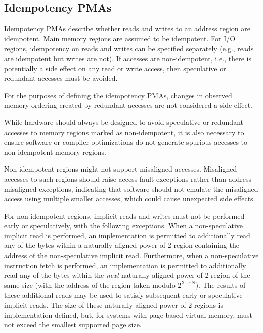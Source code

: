 \subsection{Idempotency PMAs}

Idempotency PMAs describe whether reads and writes to an address
region are idempotent.  Main memory regions are assumed to be
idempotent.  For I/O regions, idempotency on reads and writes can be
specified separately (e.g., reads are idempotent but writes are not).
If accesses are non-idempotent, i.e., there is potentially a side
effect on any read or write access, then speculative or redundant
accesses must be avoided.

For the purposes of defining the idempotency PMAs, changes in observed
memory ordering created by redundant accesses are not considered a
side effect.

\begin{commentary}
While hardware should always be designed to avoid speculative or
redundant accesses to memory regions marked as non-idempotent, it is
also necessary to ensure software or compiler optimizations do not
generate spurious accesses to non-idempotent memory regions.
\end{commentary}

\begin{commentary}
Non-idempotent regions might not support misaligned accesses.  Misaligned
accesses to such regions should raise access-fault exceptions rather than
address-misaligned exceptions, indicating that software should not emulate the
misaligned access using multiple smaller accesses, which could cause
unexpected side effects.
\end{commentary}

For non-idempotent regions, implicit reads and writes must not be performed
early or speculatively, with the following exceptions.
When a non-speculative implicit read is performed, an implementation is
permitted to additionally read any of the bytes within a naturally aligned
power-of-2 region containing the address of the non-speculative implicit read.
Furthermore, when a non-speculative instruction fetch is performed, an
implementation is permitted to additionally read any of the bytes within the
{\em next} naturally aligned power-of-2 region of the same size (with the
address of the region taken modulo $2^{\text{XLEN}}$).
The results of these additional reads may be used to satisfy subsequent early
or speculative implicit reads.
The size of these naturally aligned power-of-2 regions is
implementation-defined, but, for systems with page-based virtual memory, must
not exceed the smallest supported page size.

